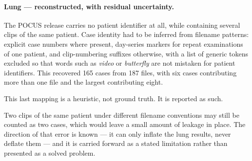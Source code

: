 \paragraph{Lung --- reconstructed, with residual uncertainty.} The POCUS release carries no
patient identifier at all, while containing several clips of the same patient. Case identity
had to be inferred from filename patterns: explicit case numbers where present, day-series
markers for repeat examinations of one patient, and clip-numbering suffixes otherwise, with
a list of generic tokens excluded so that words such as \textit{video} or \textit{butterfly}
are not mistaken for patient identifiers. This recovered 165 cases from 187 files, with six
cases contributing more than one file and the largest contributing eight.

\begin{keystatement}
This last mapping is a heuristic, not ground truth. It is reported as such.
\end{keystatement}

Two clips of the same patient under different filename conventions may still be counted as
two cases, which would leave a small amount of leakage in place. The direction of that error
is known --- it can only inflate the lung results, never deflate them --- and it is carried
forward as a stated limitation rather than presented as a solved problem.
